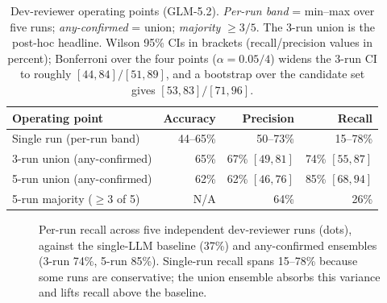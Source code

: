 \documentclass[sigconf]{acmart}
\begin{document}
\begin{table}[t]
\caption{Dev-reviewer operating points (GLM-5.2). \emph{Per-run band} = min--max over five runs; \emph{any-confirmed} = union; \emph{majority} $\ge 3/5$. The 3-run union is the post-hoc headline. Wilson 95\% CIs in brackets (recall/precision values in percent); Bonferroni over the four points ($\alpha{=}0.05/4$) widens the 3-run CI to roughly $[44,84]/[51,89]$, and a bootstrap over the candidate set gives $[53,83]/[71,96]$.}
\label{tab:opr}
\small
\begin{tabular}{@{}lrrr@{}}
\toprule
Operating point & Accuracy & Precision & Recall \\
\midrule
Single run (per-run band) & 44--65\% & 50--73\% & 15--78\% \\
3-run union (any-confirmed) & 65\% & 67\% $[49, 81]$ & 74\% $[55, 87]$ \\
5-run union (any-confirmed) & 62\% & 62\% $[46, 76]$ & 85\% $[68, 94]$ \\
5-run majority ($\ge 3$ of 5) & N/A & 64\% & 26\% \\
\bottomrule
\end{tabular}
\end{table}

\begin{figure}[t]
\centering
{}
\caption{Per-run recall across five independent dev-reviewer runs (dots), against the single-LLM baseline (37\%) and any-confirmed ensembles (3-run 74\%, 5-run 85\%). Single-run recall spans 15--78\% because some runs are conservative; the union ensemble absorbs this variance and lifts recall above the baseline.}
\label{fig:perrun}
\end{figure}
\end{document}
